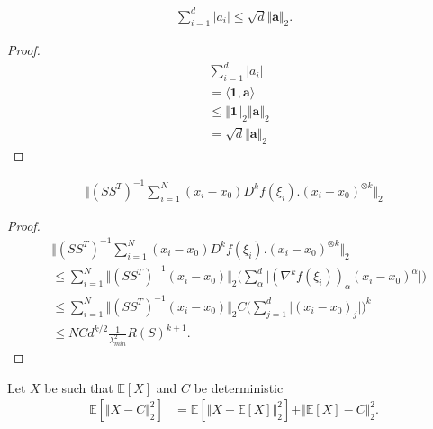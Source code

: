 \begin{lemma}
\begin{align}
    \sum_{i = 1}^d \vert a_i \vert \leq \sqrt{d} \Vert \mathbf{a} \Vert_2.
\end{align}
\end{lemma}
\begin{proof}
\begin{align}
    &\sum_{i = 1}^d \vert a_i \vert \\
    &= \langle \mathbf{1}, \mathbf{a} \rangle \\
    &\leq \Vert \mathbf{1} \Vert_2 \Vert \mathbf{a} \Vert_2 \\
    &= \sqrt{d} \Vert \mathbf{a} \Vert_2
\end{align}
\end{proof}

\begin{lemma}
\begin{align}
    \Vert (SS^T)^{-1} 
    \sum_{i = 1}^N (x_i - x_0) D^k f(\xi_i).(x_i - x_0)^{\otimes k} \Vert_2
\end{align}
\end{lemma}

\begin{proof}
\begin{align}
    &\Vert (SS^T)^{-1} 
    \sum_{i = 1}^N (x_i - x_0) D^k f(\xi_i).(x_i - x_0)^{\otimes k} \Vert_2 \\
    &\leq \sum_{i = 1}^N \Vert (SS^T)^{-1}
     (x_i - x_0)\Vert_2 \Big(\sum_{\alpha}^d \vert (\nabla^k f(\xi_i))_{\alpha} (x_i - x_0)^\alpha \vert \Big) \\
    &\leq \sum_{i = 1}^N \Vert (SS^T)^{-1}
     (x_i - x_0)\Vert_2 C \Big(\sum_{j = 1}^d \vert (x_i - x_0)_j\vert \Big)^k \\
    &\leq N C d^{k/2} \frac{1}{\lambda_{min}^2} R(S)^{k + 1}.
\end{align}
\end{proof}

\begin{lemma}
Let $X$ be such that $\mathbb{E}[X]$ and $C$ be deterministic
\begin{align}
    \mathbb{E}[\Vert X - C \Vert_2^2] &= \mathbb{E}[\Vert X - \mathbb{E}[X] \Vert_2^2] + \Vert \mathbb{E}[X] - C \Vert_2^2.
\end{align}
\end{lemma}

    




